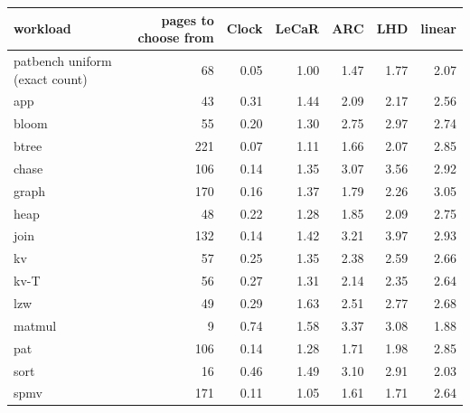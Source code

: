 \begin{tabular}{lrrrrrr}
\toprule
workload & pages to choose from & Clock & LeCaR & ARC & LHD & linear \\
\midrule
patbench uniform (exact count) & 68 & 0.05 & 1.00 & 1.47 & 1.77 & 2.07 \\
app & 43 & 0.31 & 1.44 & 2.09 & 2.17 & 2.56 \\
bloom & 55 & 0.20 & 1.30 & 2.75 & 2.97 & 2.74 \\
btree & 221 & 0.07 & 1.11 & 1.66 & 2.07 & 2.85 \\
chase & 106 & 0.14 & 1.35 & 3.07 & 3.56 & 2.92 \\
graph & 170 & 0.16 & 1.37 & 1.79 & 2.26 & 3.05 \\
heap & 48 & 0.22 & 1.28 & 1.85 & 2.09 & 2.75 \\
join & 132 & 0.14 & 1.42 & 3.21 & 3.97 & 2.93 \\
kv & 57 & 0.25 & 1.35 & 2.38 & 2.59 & 2.66 \\
kv-T & 56 & 0.27 & 1.31 & 2.14 & 2.35 & 2.64 \\
lzw & 49 & 0.29 & 1.63 & 2.51 & 2.77 & 2.68 \\
matmul & 9 & 0.74 & 1.58 & 3.37 & 3.08 & 1.88 \\
pat & 106 & 0.14 & 1.28 & 1.71 & 1.98 & 2.85 \\
sort & 16 & 0.46 & 1.49 & 3.10 & 2.91 & 2.03 \\
spmv & 171 & 0.11 & 1.05 & 1.61 & 1.71 & 2.64 \\
\bottomrule
\end{tabular}
